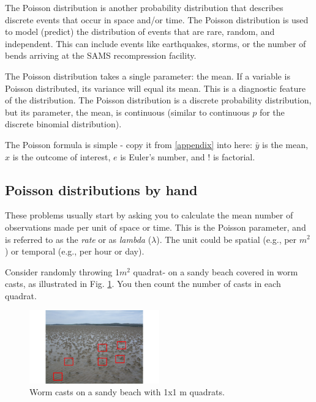 \documentclass[
  11pt,
  a4paper,
]{book}
\begin{document}
The Poisson distribution is another probability distribution that describes discrete events that occur in space and/or time. The Poisson distribution is used to model (predict) the distribution of events that are rare, random, and independent. This can include events like earthquakes, storms, or the number of bends arriving at the SAMS recompression facility.

The Poisson distribution takes a single parameter: the mean. If a variable is Poisson distributed, its variance will equal its mean. This is a diagnostic feature of the distribution. The Poisson distribution is a discrete probability distribution, but its parameter, the mean, is continuous (similar to continuous \(p\) for the discrete binomial distribution).

The Poisson formula is simple - copy it from \ref{appendix} into here:
\newline
\newline
\newline
\newline
\newline
\newline
\newline
\(\bar{y}\) is the mean, \(x\) is the outcome of interest, \(e\) is Euler's number, and \(!\) is factorial.

\hypertarget{poisson-distributions-by-hand}{%
\subsection{Poisson distributions by hand}\label{poisson-distributions-by-hand}}

These problems usually start by asking you to calculate the mean number of observations made per unit of space or time. This is the Poisson parameter, and is referred to as the \emph{rate} or as \emph{lambda} (\(\lambda\)). The unit could be spatial (e.g., per \(m^2\)) or temporal (e.g., per hour or day).

Consider randomly throwing 1\(m^2\) quadrat- on a sandy beach covered in worm casts, as illustrated in Fig. \ref{fig:worm-casts}. You then count the number of casts in each quadrat.

\begin{figure}
\centerline{\includegraphics[width=0.5\textwidth]{figs/worm_casts.png}}
\caption{Worm casts on a sandy beach with 1x1 m quadrats.}
\label{fig:worm-casts}
\end{figure}
\end{document}
